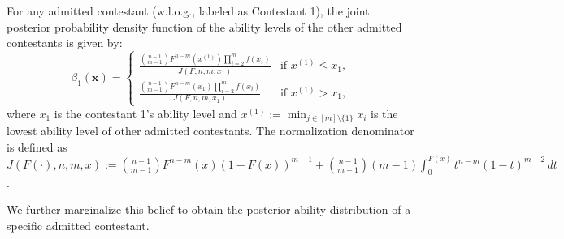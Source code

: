 \begin{proposition}\label{prop:posteriorBeliefs}
    For any admitted contestant (w.l.o.g., labeled as Contestant 1), the joint posterior probability density function of the ability levels of the other admitted contestants is given by:
    \[
        \beta_1(\mathbf{x}) =   
        \begin{cases} 
        \frac{\binom{n-1}{m-1}F^{n-m}(x^{(1)})\prod_{i=2}^{m}f(x_i)}{J(F,n,m,x_1)} & \text{if } x^{(1)} \leq x_1, \\
        \frac{\binom{n-1}{m-1}F^{n-m}(x_1)\prod_{i=2}^{m}f(x_i)}{J(F,n,m,x_1)} & \text{if } x^{(1)} > x_1,
        \end{cases}
    \]
    where $x_1$ is the contestant 1's ability level and $x^{(1)}:=\min_{j\in [m]\setminus \{1\}}x_i$ is the lowest ability level of other admitted contestants. The normalization denominator is defined as $J(F(\cdot),n,m,x) := \binom{n-1}{m-1}F^{n-m}(x)(1-F(x))^{m-1}+\binom{n-1}{m-1}(m-1)\int_0^{F(x)}t^{n-m}(1-t)^{m-2} \, dt$.
\end{proposition}

We further marginalize this belief to obtain the posterior ability distribution of a specific admitted contestant.


